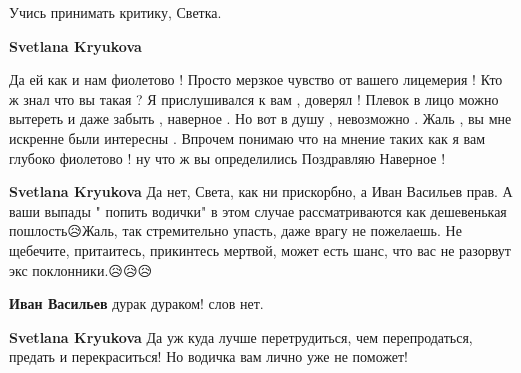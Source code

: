 \begin{itemize}
\begin{itemize}
 
Учись принимать критику, Светка.

 
\textbf{Svetlana Kryukova} 

Да ей как и нам фиолетово ! Просто мерзкое чувство от вашего лицемерия ! Кто ж
знал что вы такая ? Я прислушивался к вам , доверял ! Плевок в лицо можно
вытереть и даже забыть , наверное . Но вот в душу , невозможно . Жаль , вы мне
искренне были интересны . Впрочем понимаю что на мнение таких как я вам глубоко
фиолетово ! ну что ж вы определились Поздравляю Наверное !

 
\textbf{Svetlana Kryukova} Да нет, Света, как ни прискорбно, а Иван Васильев прав. А ваши выпады " попить водички" в этом случае рассматриваются как дешевенькая пошлость😥Жаль, так стремительно упасть, даже врагу не пожелаешь.
Не щебечите, притаитесь, прикинтесь мертвой, может есть шанс, что вас не разорвут экс поклонники.😥😥😥

 
\textbf{Иван Васильев} дурак дураком! слов нет.

 
\textbf{Svetlana Kryukova} Да уж куда лучше перетрудиться, чем перепродаться, предать и перекраситься! Но водичка вам лично уже не поможет!

 

\end{itemize}
\end{itemize}
